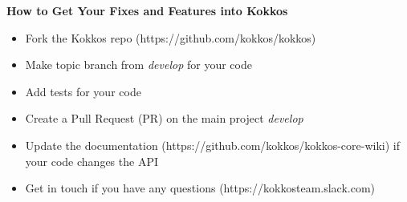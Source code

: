 \begin{frame}[fragile]

  \vspace{10pt}

  \textbf{How to Get Your Fixes and Features into Kokkos}
  \newline
  \begin{itemize}
    \item Fork the Kokkos repo (https://github.com/kokkos/kokkos)
    \item Make topic branch from \textit{develop} for your code
    \item Add tests for your code
    \item Create a Pull Request (PR) on the main project \textit{develop}
    \item Update the documentation (https://github.com/kokkos/kokkos-core-wiki) if your code changes the API
    \item Get in touch if you have any questions (https://kokkosteam.slack.com)
  \end{itemize}

\end{frame}






